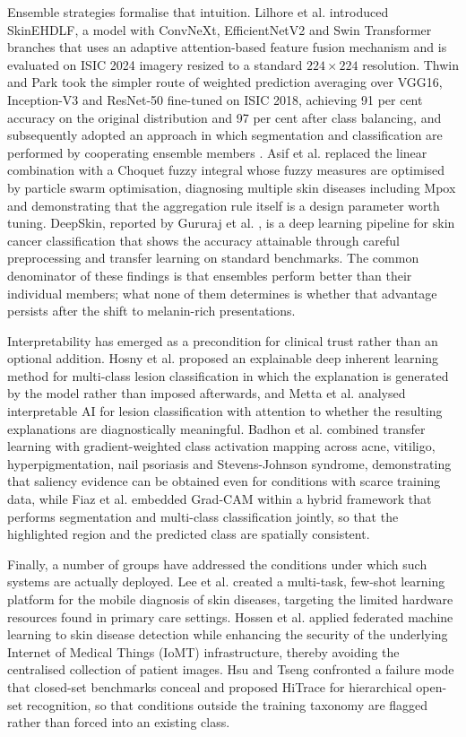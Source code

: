 \documentclass[pdflatex,sn-mathphys-num]{sn-jnl}%
\begin{document}
Ensemble strategies formalise that intuition. Lilhore et al. \cite{ref14} introduced
SkinEHDLF, a model with ConvNeXt, EfficientNetV2 and Swin Transformer branches that uses an
adaptive attention-based feature fusion mechanism and is evaluated on ISIC 2024 imagery
resized to a standard $224 \times 224$ resolution. Thwin and Park \cite{ref15} took the
simpler route of weighted prediction averaging over VGG16, Inception-V3 and ResNet-50
fine-tuned on ISIC 2018, achieving 91 per cent accuracy on the original distribution and 97
per cent after class balancing, and subsequently adopted an approach in which segmentation
and classification are performed by cooperating ensemble members \cite{ref16}. Asif et al.
\cite{ref17} replaced the linear combination with a Choquet fuzzy integral whose fuzzy
measures are optimised by particle swarm optimisation, diagnosing multiple skin diseases
including Mpox and demonstrating that the aggregation rule itself is a design parameter
worth tuning. DeepSkin, reported by Gururaj et al. \cite{ref18}, is a deep learning pipeline
for skin cancer classification that shows the accuracy attainable through careful
preprocessing and transfer learning on standard benchmarks. The common denominator of these
findings is that ensembles perform better than their individual members; what none of them
determines is whether that advantage persists after the shift to melanin-rich presentations.

Interpretability has emerged as a precondition for clinical trust rather than an optional
addition. Hosny et al. \cite{ref19} proposed an explainable deep inherent learning method
for multi-class lesion classification in which the explanation is generated by the model
rather than imposed afterwards, and Metta et al. \cite{ref20} analysed interpretable AI for
lesion classification with attention to whether the resulting explanations are
diagnostically meaningful. Badhon et al. \cite{ref21} combined transfer learning with
gradient-weighted class activation mapping across acne, vitiligo, hyperpigmentation, nail
psoriasis and Stevens-Johnson syndrome, demonstrating that saliency evidence can be obtained
even for conditions with scarce training data, while Fiaz et al. \cite{ref22} embedded
Grad-CAM within a hybrid framework that performs segmentation and multi-class classification
jointly, so that the highlighted region and the predicted class are spatially consistent.

Finally, a number of groups have addressed the conditions under which such systems are
actually deployed. Lee et al. \cite{ref23} created a multi-task, few-shot learning platform
for the mobile diagnosis of skin diseases, targeting the limited hardware resources found in
primary care settings. Hossen et al. \cite{ref24} applied federated machine learning to skin
disease detection while enhancing the security of the underlying Internet of Medical Things
(IoMT) infrastructure, thereby avoiding the centralised collection of patient images. Hsu
and Tseng \cite{ref25} confronted a failure mode that closed-set benchmarks conceal and
proposed HiTrace for hierarchical open-set recognition, so that conditions outside the
training taxonomy are flagged rather than forced into an existing class.
\end{document}

